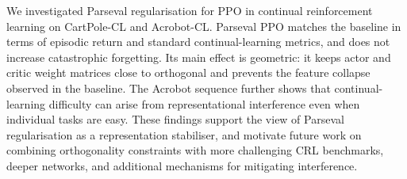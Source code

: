 \documentclass[conference]{IEEEtran}
\begin{document}
We investigated Parseval regularisation for PPO in continual reinforcement learning on CartPole-CL and Acrobot-CL. Parseval PPO matches the baseline in terms of episodic return and standard continual-learning metrics, and does not increase catastrophic forgetting. Its main effect is geometric: it keeps actor and critic weight matrices close to orthogonal and prevents the feature collapse observed in the baseline. The Acrobot sequence further shows that continual-learning difficulty can arise from representational interference even when individual tasks are easy. These findings support the view of Parseval regularisation as a representation stabiliser, and motivate future work on combining orthogonality constraints with more challenging CRL benchmarks, deeper networks, and additional mechanisms for mitigating interference.


\end{document}
